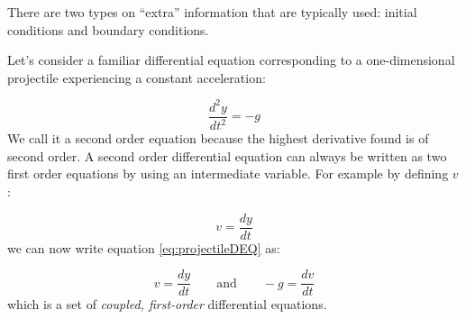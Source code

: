There are two types on ``extra'' information that are typically used:
initial conditions and boundary conditions.  

Let's consider a familiar differential equation
corresponding to a one-dimensional projectile experiencing a constant acceleration:

\begin{equation}\label{eq:projectileDEQ}
\frac{d^2y}{dt^2} = -g
\end{equation}
 We call it a second order equation because the
highest derivative found is of second order.  A second order
differential equation can always be written as two first order
equations by using an intermediate variable.  For example by defining $v$:

\begin{equation}
v = \frac{dy}{dt}
\end{equation}
we can now write equation
\eqref{eq:projectileDEQ} as:

\begin{equation}
v = \frac{dy}{dt}\qquad \textrm{and} \qquad -g = \frac{dv}{dt}
\end{equation}
which is a set of \textit{coupled, first-order} differential equations.